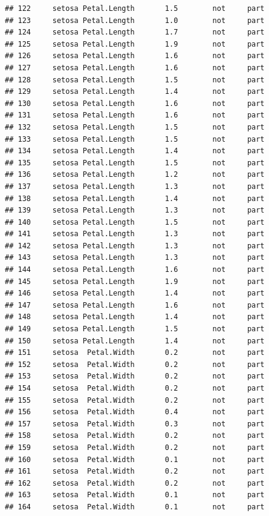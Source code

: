 \documentclass[krantz2]{krantz}\usepackage{knitr}%
\begin{document}
\begin{knitrout}
\begin{kframe}
\begin{verbatim}
## 122     setosa Petal.Length       1.5        not     part
## 123     setosa Petal.Length       1.0        not     part
## 124     setosa Petal.Length       1.7        not     part
## 125     setosa Petal.Length       1.9        not     part
## 126     setosa Petal.Length       1.6        not     part
## 127     setosa Petal.Length       1.6        not     part
## 128     setosa Petal.Length       1.5        not     part
## 129     setosa Petal.Length       1.4        not     part
## 130     setosa Petal.Length       1.6        not     part
## 131     setosa Petal.Length       1.6        not     part
## 132     setosa Petal.Length       1.5        not     part
## 133     setosa Petal.Length       1.5        not     part
## 134     setosa Petal.Length       1.4        not     part
## 135     setosa Petal.Length       1.5        not     part
## 136     setosa Petal.Length       1.2        not     part
## 137     setosa Petal.Length       1.3        not     part
## 138     setosa Petal.Length       1.4        not     part
## 139     setosa Petal.Length       1.3        not     part
## 140     setosa Petal.Length       1.5        not     part
## 141     setosa Petal.Length       1.3        not     part
## 142     setosa Petal.Length       1.3        not     part
## 143     setosa Petal.Length       1.3        not     part
## 144     setosa Petal.Length       1.6        not     part
## 145     setosa Petal.Length       1.9        not     part
## 146     setosa Petal.Length       1.4        not     part
## 147     setosa Petal.Length       1.6        not     part
## 148     setosa Petal.Length       1.4        not     part
## 149     setosa Petal.Length       1.5        not     part
## 150     setosa Petal.Length       1.4        not     part
## 151     setosa  Petal.Width       0.2        not     part
## 152     setosa  Petal.Width       0.2        not     part
## 153     setosa  Petal.Width       0.2        not     part
## 154     setosa  Petal.Width       0.2        not     part
## 155     setosa  Petal.Width       0.2        not     part
## 156     setosa  Petal.Width       0.4        not     part
## 157     setosa  Petal.Width       0.3        not     part
## 158     setosa  Petal.Width       0.2        not     part
## 159     setosa  Petal.Width       0.2        not     part
## 160     setosa  Petal.Width       0.1        not     part
## 161     setosa  Petal.Width       0.2        not     part
## 162     setosa  Petal.Width       0.2        not     part
## 163     setosa  Petal.Width       0.1        not     part
## 164     setosa  Petal.Width       0.1        not     part

\end{verbatim}
\end{kframe}
\end{knitrout}
\end{document}
